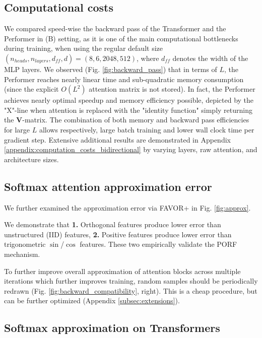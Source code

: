 \subsection{Computational costs} We compared speed-wise the backward pass of the Transformer and the Performer in (B) setting, as it is one of the main computational bottlenecks during training, when using the regular default size $(n_{heads}, n_{layers}, d_{ff}, d) = (8,6,2048,512)$, where $d_{ff}$ denotes the width of the MLP layers. We observed (Fig. \ref{fig:backward_pass}) that in terms of $L$, the Performer reaches nearly linear time and sub-quadratic memory consumption (since the explicit $O(L^{2})$ attention matrix is not stored). In fact, the Performer achieves nearly optimal speedup and memory efficiency possible, depicted by the "X"-line when attention is replaced with the "identity function" simply returning the $\mathbf{V}$-matrix. The combination of both memory and backward pass efficiencies for large $L$ allows respectively, large batch training and lower wall clock time per gradient step. Extensive additional results are demonstrated in Appendix \ref{appendix:computation_costs_bidirectional} by varying layers, raw attention, and architecture sizes.

\subsection{Softmax attention approximation error}
\label{subsec:approx_error_compatibility}

We further examined the approximation error via FAVOR+ in Fig. \ref{fig:approx}.

We demonstrate that \textbf{1.} Orthogonal features produce lower error than unstructured (IID) features, \textbf{2.} Positive features produce lower error than trigonometric $\sin$/$\cos$ features. These two empirically validate the PORF mechanism.

To further improve overall approximation of attention blocks across multiple iterations which further improves training, random samples should be periodically redrawn (Fig. \ref{fig:backward_compatibility}, right). This is a cheap procedure, but can be further optimized (Appendix \ref{subsec:extensions}).

\subsection{Softmax approximation on Transformers}
\label{subsec:softmax_approx_transformer}

